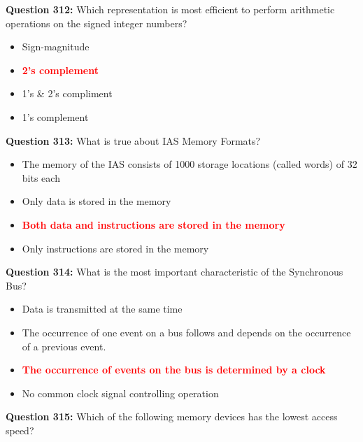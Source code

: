 \documentclass[12pt,a4paper]{article}
\begin{document}
\vspace{0.5cm}

\textbf{Question 312:} Which representation is most efficient to perform arithmetic operations on the signed integer numbers?

\begin{itemize}
    \item[\textbf{A.}] Sign-magnitude
    \item[\textbf{B.}] \textcolor{red}{\textbf{2's complement}}
    \item[\textbf{C.}] 1's \& 2's compliment
    \item[\textbf{D.}] 1's complement
\end{itemize}

\vspace{0.5cm}

\textbf{Question 313:} What is true about IAS Memory Formats?

\begin{itemize}
    \item[\textbf{A.}] The memory of the IAS consists of 1000 storage locations (called words) of 32 bits each
    \item[\textbf{B.}] Only data is stored in the memory
    \item[\textbf{C.}] \textcolor{red}{\textbf{Both data and instructions are stored in the memory}}
    \item[\textbf{D.}] Only instructions are stored in the memory
\end{itemize}

\vspace{0.5cm}

\textbf{Question 314:} What is the most important characteristic of the Synchronous Bus?

\begin{itemize}
    \item[\textbf{A.}] Data is transmitted at the same time
    \item[\textbf{B.}] The occurrence of one event on a bus follows and depends on the occurrence of a previous event.
    \item[\textbf{C.}] \textcolor{red}{\textbf{The occurrence of events on the bus is determined by a clock}}
    \item[\textbf{D.}] No common clock signal controlling operation
\end{itemize}

\vspace{0.5cm}

\textbf{Question 315:} Which of the following memory devices has the lowest access speed?
\end{document}
